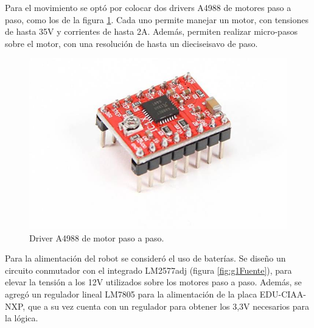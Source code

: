 Para el movimiento se optó por colocar dos drivers A4988 de motores paso a paso, como los de la figura \ref{fig:a4988}. Cada uno permite manejar un motor, con tensiones de hasta 35V y corrientes de hasta 2A. Además, permiten realizar micro-pasos sobre el motor, con una resolución de hasta un dieciseisavo de paso.

\begin{figure}[H]
\centering
\includegraphics[scale=.4]{./Figures/a4988.jpeg}
\caption{Driver A4988 de motor paso a paso.}
\label{fig:a4988}
\end{figure}

Para la alimentación del robot se consideró el uso de baterías. Se diseño un circuito conmutador con el integrado LM2577adj (figura \ref{fig:g1Fuente}), para elevar la tensión a los 12V utilizados sobre los motores paso a paso. Además, se agregó un regulador lineal LM7805 para la alimentación de la placa EDU-CIAA-NXP, que a su vez cuenta con un regulador para obtener los 3,3V necesarios para la lógica.

